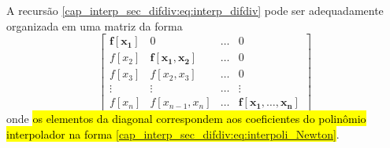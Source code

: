 \begin{obs}
  A recursão \eqref{cap_interp_sec_difdiv:eq:interp_difdiv} pode ser adequadamente organizada em uma matriz da forma
  \begin{equation}
    \begin{bmatrix}
      \pmb{f[x_1]} & 0 & \ldots & 0 \\
      f[x_2] & \pmb{f[x_1,x_2]} & \ldots & 0 \\
      f[x_3] & f[x_2,x_3] & \ldots & 0\\
      \vdots & \vdots & \ldots & \vdots \\
      f[x_n] & f[x_{n-1},x_{n}] & \ldots & \pmb{f[x_1,\dotsc,x_n]}
    \end{bmatrix}
  \end{equation}
onde \hl{os elementos da diagonal correspondem aos coeficientes do polinômio interpolador na forma {\eqref{cap_interp_sec_difdiv:eq:interpoli_Newton}}}.
\end{obs}



